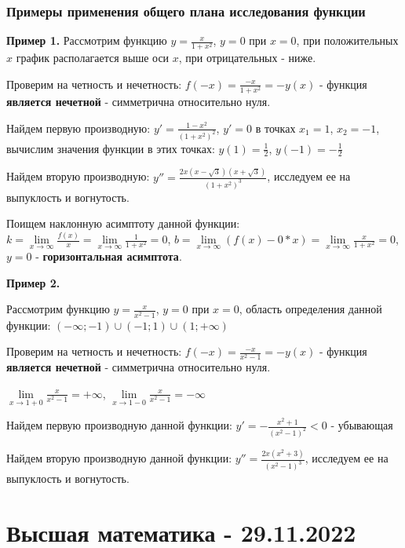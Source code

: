 \documentclass{article}
\begin{document}
\begin{flushleft}
\subsubsection{Примеры применения общего плана исследования функции}

\textbf{Пример 1.} Рассмотрим функцию $y = \frac{x}{1 + x^2}$, $y = 0$ при $x = 0$, при положительных $x$ график располагается выше оси $x$, при отрицательных - ниже.

Проверим на четность и нечетность: $f(-x) = \frac{-x}{1 + x^2} = -y(x)$ - функция \textbf{является нечетной} - симметрична относительно нуля.

Найдем первую производную: $y' = \frac{1 - x^2}{(1 + x^2)^2}$, $y' = 0$ в точках $x_1 = 1$, $x_2 = -1$, вычислим значения функции в этих точках: $y(1) = \frac{1}{2}$, $y(-1) = -\frac{1}{2}$

Найдем вторую производную: $y'' = \frac{2x(x-\sqrt{3})(x+\sqrt{3})}{(1 + x^2)^3}$, исследуем ее на выпуклость и вогнутость.

Поищем наклонную асимптоту данной функции: $k = \lim\limits_{x \to \infty} \frac{f(x)}{x} = \lim\limits_{x \to \infty} \frac{1}{1 + x^2} = 0$, $b = \lim\limits_{x \to \infty} (f(x) - 0 * x) = \lim\limits_{x \to \infty} \frac{x}{1 + x^2} = 0$, $y = 0$ - \textbf{горизонтальная асимптота}.

\hfill

\textbf{Пример 2.}

Рассмотрим функцию $y = \frac{x}{x^2 - 1}$, $y = 0$ при $x = 0$, область определения данной функции: $(-\infty; -1) \cup (-1; 1) \cup (1; +\infty)$

Проверим на четность и нечетность: $f(-x) = \frac{-x}{x^2 - 1} = -y(x)$ - функция \textbf{является нечетной} - симметрична относительно нуля.

$\lim\limits_{x \to 1 + 0} \frac{x}{x^2 - 1} = +\infty$, $\lim\limits_{x \to 1 - 0} \frac{x}{x^2 - 1} = -\infty$

Найдем первую производную данной функции: $y' = - \frac{x^2 + 1}{(x^2 - 1)^2} < 0$ - убывающая 

Найдем вторую производную данной функции: $y'' = \frac{2x(x^2 + 3)}{(x^2 - 1)^3}$, исследуем ее на выпуклость и вогнутость.

\end{flushleft}

\pagebreak
\section{Высшая математика - 29.11.2022}
\end{document}
